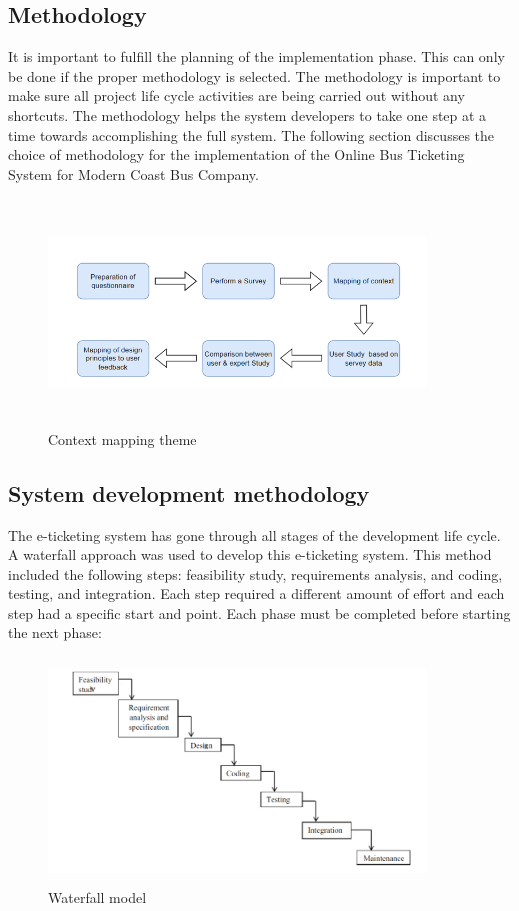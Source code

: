 \documentclass{article}
\begin{document}
\subsection{Methodology}
It is important to fulfill the planning of the implementation phase. This can only be done if the proper methodology is selected. The methodology is important to make sure all project life cycle activities are being carried out without any shortcuts. The methodology helps the system developers to take one step at a time towards accomplishing the full system. The following section discusses the choice of methodology for the implementation of the Online Bus Ticketing System for Modern Coast Bus Company.
\begin{figure}[h]
    \centering
    \includegraphics[width=10cm, height=6cm]{img/methelodo.png}
    \caption{Context mapping theme}
    \label{fig:my_label}
\end{figure}
\subsection{System development methodology }
The e-ticketing system has gone through all stages of the development life cycle. A waterfall approach was used to develop this e-ticketing system. This method included the following steps: feasibility study, requirements analysis, and coding, testing, and integration. Each step required a different amount of effort and each step had a specific start and point. Each phase must be completed before starting the next phase:
\begin{figure}[h]
    \centering
    \includegraphics[width=10cm,height=6cm]{img/palnningmodel.png}
    \caption{Waterfall model}
    \label{fig:my_label}
\end{figure}
\newpage
\end{document}

